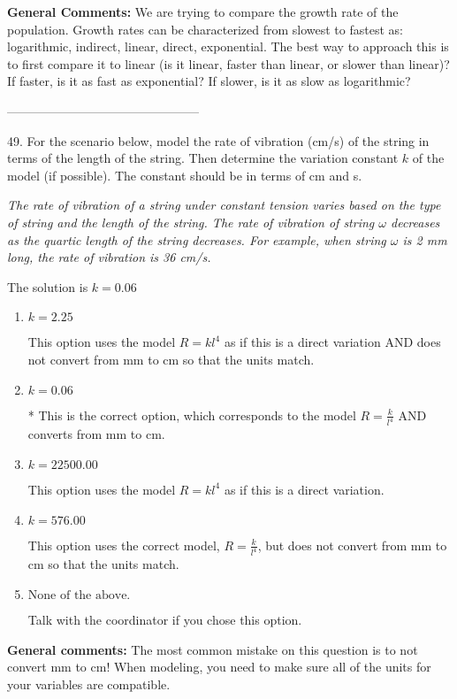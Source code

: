\documentclass{article}[14pt]
\begin{document}
\textbf{General Comments:} We are trying to compare the growth rate of the population. Growth rates can be characterized from slowest to fastest as: logarithmic, indirect, linear, direct, exponential. The best way to approach this is to first compare it to linear (is it linear, faster than linear, or slower than linear)? If faster, is it as fast as exponential? If slower, is it as slow as logarithmic?

-----------------------------------------------

49. For the scenario below, model the rate of vibration (cm/s) of the string in terms of the length of the string. Then determine the variation constant $k$ of the model (if possible). The constant should be in terms of cm and s.
\begin{center} \textit{The rate of vibration of a string under constant tension varies based on the type of string and the length of the string. The rate of vibration of string $\omega$ decreases as the quartic length of the string decreases. For example, when string $\omega$ is 2 mm long, the rate of vibration is 36 cm/s.} \end{center} 
The solution is $ k = 0.06 $ 

\begin{enumerate}[label=\Alph*.] 
\item $ k = 2.25 $ 

 This option uses the model $R = kl^{4}$ as if this is a direct variation AND does not convert from mm to cm so that the units match. 
\item $ k = 0.06 $ 

 * This is the correct option, which corresponds to the model $R = \frac{k}{l^{4}}$ AND converts from mm to cm. 
\item $ k = 22500.00 $ 

 This option uses the model $R = kl^{4}$ as if this is a direct variation. 
\item $ k = 576.00 $ 

 This option uses the correct model, $R = \frac{k}{l^{4}}$, but does not convert from mm to cm so that the units match. 
\item $ \text{None of the above.} $ 

 Talk with the coordinator if you chose this option. 
\end{enumerate} 
 
\textbf{General comments:} The most common mistake on this question is to not convert mm to cm! When modeling, you need to make sure all of the units for your variables are compatible.
\end{document}
